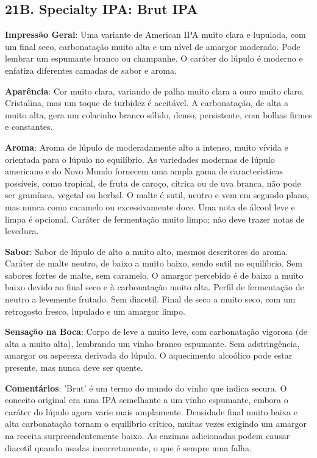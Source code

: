 \subsection*{21B. Specialty IPA: Brut IPA}

\textbf{Impressão Geral}: Uma variante de American IPA muito clara e lupulada, com um final seco, carbonatação muito alta e um nível de amargor moderado. Pode lembrar um espumante branco ou champanhe. O caráter do lúpulo é moderno e enfatiza diferentes camadas de sabor e aroma.

\textbf{Aparência}: Cor muito clara, variando de palha muito clara a ouro muito claro. Cristalina, mas um toque de turbidez é aceitável. A carbonatação, de alta a muito alta, gera um colarinho branco sólido, denso, persistente, com bolhas firmes e constantes.

\textbf{Aroma}: Aroma de lúpulo de moderadamente alto a intenso, muito vívida e orientada para o lúpulo no equilíbrio. As variedades modernas de lúpulo americano e do Novo Mundo fornecem uma ampla gama de características possíveis, como tropical, de fruta de caroço, cítrica ou de uva branca, não pode ser gramínea, vegetal ou herbal. O malte é sutil, neutro e vem em segundo plano, mas nunca como caramelo ou excessivamente doce. Uma nota de álcool leve e limpa é opcional. Caráter de fermentação muito limpo; não deve trazer notas de levedura.

\textbf{Sabor}: Sabor de lúpulo de alto a muito alto, mesmos descritores do aroma. Caráter de malte neutro, de baixo a muito baixo, sendo sutil no equilíbrio. Sem sabores fortes de malte, sem caramelo. O amargor percebido é de baixo a muito baixo devido ao final seco e à carbonatação muito alta. Perfil de fermentação de neutro a levemente frutado. Sem diacetil. Final de seco a muito seco, com um retrogosto fresco, lupulado e um amargor limpo.

\textbf{Sensação na Boca}: Corpo de leve a muito leve, com carbonatação vigorosa (de alta a muito alta), lembrando um vinho branco espumante. Sem adstringência, amargor ou aspereza derivada do lúpulo. O aquecimento alcoólico pode estar presente, mas nunca deve ser quente.

\textbf{Comentários}: 'Brut' é um termo do mundo do vinho que indica secura. O conceito original era uma IPA semelhante a um vinho espumante, embora o caráter do lúpulo agora varie mais amplamente. Densidade final muito baixa e alta carbonatação tornam o equilíbrio crítico, muitas vezes exigindo um amargor na receita surpreendentemente baixo. As enzimas adicionadas podem causar diacetil quando usadas incorretamente, o que é sempre uma falha.

